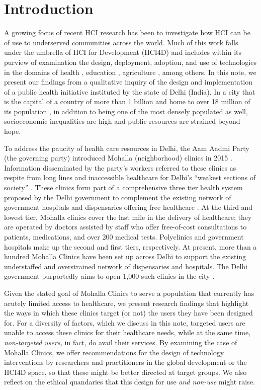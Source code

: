 \section{Introduction}

A growing focus of recent HCI research has been to investigate how HCI can be of use to underserved communities across the world. Much of this work falls under the umbrella of HCI for Development (HCI4D) and includes within its purview of examination the design, deployment, adoption, and use of technologies in the domains of health \cite{DeRenzi:2008:EIP:1357054.1357174}, education \cite{ho2009human}, agriculture \cite{Patel:2010:AOF:1753326.1753434}, among others. In this note, we present our findings from a qualitative inquiry of the design and implementation of a public health initiative instituted by the state of Delhi (India). In a city that is the capital of a country of more than 1 billion and home to over 18 million of its population \cite{}, in addition to being one of the most densely populated as well, socioeconomic inequalities are high and public resources are strained beyond hope. 

To address the paucity of health care resources in Delhi, the Aam Aadmi Party (the governing party) introduced Mohalla (neighborhood) clinics in 2015 \cite{}. Information disseminated by the party's workers referred to these clinics as respite from long lines and inaccessible healthcare for Delhi's ``weakest sections of society'' \cite{AAPpressrelease}. These clinics form part of a comprehensive three tier health system proposed by the Delhi government to complement the existing network of government hospitals and dispensaries offering free healthcare \cite{article}. At the third and lowest tier, Mohalla clinics cover the last mile in the delivery of healthcare; they are operated by doctors assisted by staff who offer free-of-cost consultations to patients, medications, and over 200 medical tests. Polyclinics and government hospitals make up the second and first tiers, respectively. At present, more than a hundred Mohalla Clinics have been set up across Delhi to support the existing understaffed and overstrained network of dispensaries and hospitals. The Delhi government purportedly aims to open 1,000 such clinics in the city \cite{}.

Given the stated goal of Mohalla Clinics to serve a population that currently has acutely limited access to healthcare, we present research findings that highlight the ways in which these clinics target (or not) the users they have been designed for. For a diversity of factors, which we discuss in this note, targeted users are unable to access these clinics for their healthcare needs, while at the same time, \textit{non-targeted users,} in fact, do avail their services. By examining the case of Mohalla Clinics, we offer recommendations for the design of technology interventions by researchers and practitioners in the global development or the HCI4D space, so that these might be better directed at target groups. We also reflect on the ethical quandaries that this design for use \emph{and non-use} might raise. 


